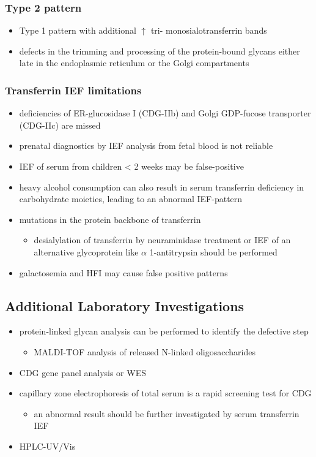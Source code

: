 \documentclass[12pt]{scrartcl}
\begin{document}
\subsubsection{Type 2 pattern}
\label{sec:org2f57027}
\begin{itemize}
\item Type 1 pattern with additional \(\uparrow\) tri- \textpm{}
monosialotransferrin bands
\item defects in the trimming and processing of the protein-bound
glycans either late in the endoplasmic reticulum or the Golgi
compartments
\end{itemize}

\subsubsection{Transferrin IEF limitations}
\label{sec:org89b3a86}
\begin{itemize}
\item deficiencies of ER-glucosidase I (CDG-IIb) and Golgi GDP-fucose
transporter (CDG-IIc) are missed
\item prenatal diagnostics by IEF analysis from fetal blood is not
reliable
\item IEF of serum from children \textless{} 2 weeks may be false-positive
\item heavy alcohol consumption can also result in serum transferrin
deficiency in carbohydrate moieties, leading to an abnormal
IEF-pattern
\item mutations in the protein backbone of transferrin
\begin{itemize}
\item desialylation of transferrin by neuraminidase treatment or IEF of
an alternative glycoprotein like \(\alpha\) 1-antitrypsin should be
performed
\end{itemize}
\item galactosemia and HFI may cause false positive patterns
\end{itemize}
\subsection{Additional Laboratory Investigations}
\label{sec:orgc2c08fa}
\begin{itemize}
\item protein-linked glycan analysis can be performed to identify the defective step
\begin{itemize}
\item MALDI-TOF analysis of released N-linked oligosaccharides
\end{itemize}
\item CDG gene panel analysis or WES

\item capillary zone electrophoresis of total serum is a rapid screening
test for CDG
\begin{itemize}
\item an abnormal result should be further investigated by serum
transferrin IEF
\end{itemize}
\item HPLC-UV/Vis
\end{itemize}
\end{document}
